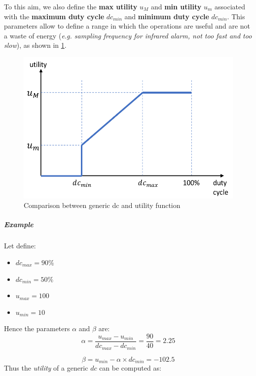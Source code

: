 \documentclass[10pt,a4paper]{report}
\theoremstyle{definition}
\begin{document}
To this aim, we also define the \textbf{max utility} $u_{M}$ and \textbf{min utility} $u_{m}$ associated with the \textbf{maximum duty cycle} $dc_{min}$ and \textbf{minimum duty cycle} $dc_{min}$. This parameters allow to define a range in which the operations are useful and are not a waste of energy (\textit{e.g. sampling frequency for infrared alarm, not too fast and too slow}), as shown in \ref{generic-dc}.
\begin{figure}[h]
	\centering\includegraphics[scale=0.30]{images/Pasted image 20230509154808.png}
	\caption{Comparison between generic dc and utility function}
	\label{generic-dc}

\end{figure}

\subparagraph{Example}\label{sec:example}
Let define:
\begin{itemize}
	\item 
	$dc_{max} = 90\%$
	\item 
	$dc_{min} = 50\%$
	\item 
	$u_{max} = 100$
	\item 
	$u_{min} = 10$
	
\end{itemize}
Hence the parameters $\alpha$ and $\beta$ are:
\begin{equation}
	\alpha = \frac{u_{max}-u_{min}}{dc_{max}-dc_{min}} = \frac{90}{40} = 2.25
\end{equation}

\begin{equation}
	\beta = u_{min}-\alpha \times dc_{min} = -102.5
\end{equation}
Thus the \textit{utility} of a generic $dc$ can be computed as:
\end{document}

